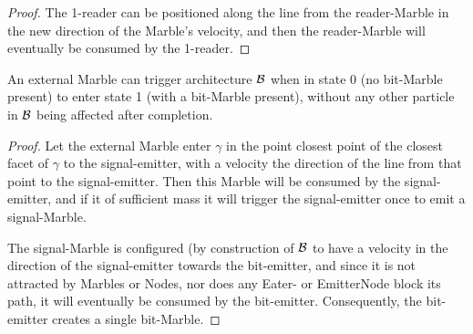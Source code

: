 \begin{proof}
    The 1-reader can be positioned along the line from the reader-Marble in the new direction of the Marble's velocity, and then the reader-Marble will eventually be consumed by the 1-reader.
\end{proof}

\begin{lemma}
    An external Marble can trigger architecture $\mathcal{B}$ when in state 0 (no bit-Marble present) to enter state 1 (with a bit-Marble present), without any other particle in $\mathcal{B}$ being affected after completion.
    \label{lemma:writing}
\end{lemma}
\begin{proof}
    Let the external Marble enter $\gamma$ in the point closest point of the closest facet of $\gamma$ to the signal-emitter, with a velocity the direction of the line from that point to the signal-emitter. Then this Marble will be consumed by the signal-emitter, and if it of sufficient mass it will trigger the signal-emitter once to emit a signal-Marble.
    
    The signal-Marble is configured (by construction of $\mathcal{B}$ to have a velocity in the direction of the signal-emitter towards the bit-emitter, and since it is not attracted by Marbles or Nodes, nor does any Eater- or EmitterNode block its path, it will eventually be consumed by the bit-emitter. Consequently, the bit-emitter creates a single bit-Marble.
\end{proof}

